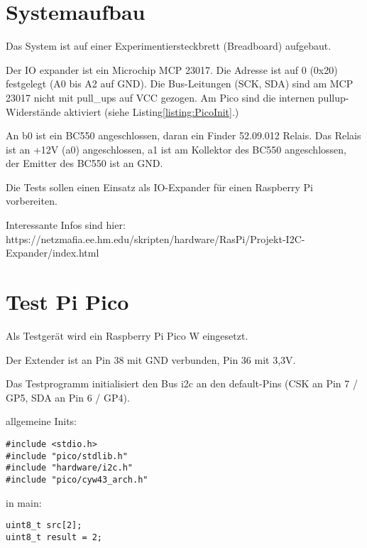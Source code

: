 \documentclass[a4paper,10pt]{scrartcl}
\title{}
\author{}
\begin{document}
\maketitle

\begin{abstract}
\end{abstract}

\section{Systemaufbau}
Das System ist auf einer Experimentiersteckbrett (Breadboard) aufgebaut.

Der IO expander ist ein Microchip MCP 23017. Die Adresse ist auf 0 (0x20) festgelegt (A0 bis A2 auf GND). Die Bus-Leitungen (SCK, SDA) sind am MCP 23017 nicht mit pull\_ups auf VCC gezogen. Am Pico sind die internen pullup-Widerstände aktiviert (siehe Listing\ref{listing:PicoInit}.)

An b0 ist ein BC550 angeschlossen, daran ein Finder 52.09.012 Relais. Das Relais ist an +12V (a0) angeschlossen, a1 ist am Kollektor des BC550 angeschlossen, der Emitter des BC550 ist an GND.

Die Tests sollen einen Einsatz als IO-Expander für einen Raspberry Pi vorbereiten.

Interessante Infos sind hier: https://netzmafia.ee.hm.edu/skripten/hardware/RasPi/Projekt-I2C-Expander/index.html

\section{Test Pi Pico}
Als Testgerät wird ein Raspberry Pi Pico W eingesetzt.

Der Extender ist an Pin 38 mit GND verbunden, Pin 36 mit 3,3V.

Das Testprogramm initialisiert den Bus i2c an den default-Pins (CSK an Pin 7 / GP5, SDA an Pin 6 / GP4).

allgemeine Inits:
\begin{lstlisting}[float,caption=Includes (Pi Pico),captionpos=b,label=listing:PicoInclude]
#include <stdio.h>
#include "pico/stdlib.h"
#include "hardware/i2c.h"
#include "pico/cyw43_arch.h"
\end{lstlisting}

in main:
\begin{lstlisting}[float,caption=Variablen für Kommunikation,captionpos=b,label=listing:PicoVars]
uint8_t src[2];
uint8_t result = 2;
\end{lstlisting}
\end{document}
